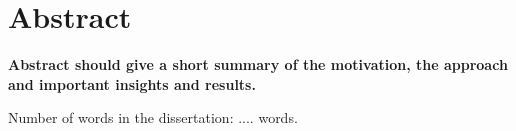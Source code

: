 \chapter*{Abstract}
\textbf{
Abstract should give a short summary of the motivation, the approach and important insights and results.}
%
\vfill
\begin{flushright}
 Number of words in the dissertation: .... words.
\end{flushright}
    
